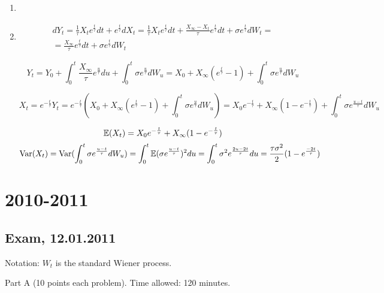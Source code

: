 \documentclass[12pt, a4paper]{article}
\begin{document}
\begin{enumerate}
\item

\item

\begin{multline*}
dY_t=\frac{1}{\tau}X_t e^{\frac{t}{\tau}}dt+ e^{\frac{t}{\tau}}dX_t=
\frac{1}{\tau}X_t e^{\frac{t}{\tau}}dt+\frac{X_{\infty}-X_t}{\tau} e^{\frac{t}{\tau}}dt+ \sigma e^{\frac{t}{\tau}}dW_t=\\
=\frac{X_{\infty}}{\tau} e^{\frac{t}{\tau}}dt+ \sigma e^{\frac{t}{\tau}}dW_t
\end{multline*}

\[
Y_t=Y_0+\int_{0}^{t} \frac{X_{\infty}}{\tau} e^{\frac{u}{\tau}}du+\int_{0}^{t} \sigma e^{\frac{u}{\tau}}dW_u=
X_0+X_{\infty}(e^{\frac{t}{\tau}}-1)+\int_{0}^{t} \sigma e^{\frac{u}{\tau}}dW_u
\]

\[
X_t=e^{-\frac{t}{\tau}}Y_t= e^{-\frac{t}{\tau}} (X_0+X_{\infty}(e^{\frac{t}{\tau}}-1)+\int_{0}^{t} \sigma e^{\frac{u}{\tau}}dW_u) =X_0 e^{-\frac{t}{\tau}} +X_{\infty}(1- e^{-\frac{t}{\tau}})+\int_{0}^{t} \sigma e^{\frac{u-t}{\tau}}dW_u
\]


\[
\mathbb{E}(X_t)= X_0 e^{-\frac{t}{\tau}} +X_{\infty}(1- e^{-\frac{t}{\tau}})
\]
\[
\operatorname{Var}(X_t)= \operatorname{Var}( \int_{0}^{t} \sigma e^{\frac{u-t}{\tau}}dW_u )=\int_{0}^{t} \mathbb{E} (\sigma e^{\frac{u-t}{\tau}})^2du = \int_{0}^{t}\sigma^2 e^{\frac{2u-2t}{\tau}}du=\frac{\tau \sigma^2}{2} (1- e^{\frac{-2t}{\tau}})
\]

\end{enumerate}

\section{2010-2011}

\subsection{Exam, 12.01.2011}

Notation: $W_t$ is the standard Wiener process.


Part A (10 points each problem). Time allowed: 120 minutes.
\end{document}
